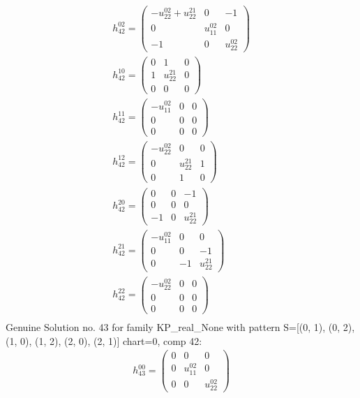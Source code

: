\documentclass[a4paper, 11pt, twoside, onecolumn]{article}
\begin{document}
\begin{landscape}
\begin{gather*}
	 h_{42}^{02}=\begin{pmatrix}- u^{02}_{22} + u^{21}_{22} & 0 & -1\\0 & u^{02}_{11} & 0\\-1 & 0 & u^{02}_{22}\end{pmatrix}\\ 
	 h_{42}^{10}=\begin{pmatrix}0 & 1 & 0\\1 & u^{21}_{22} & 0\\0 & 0 & 0\end{pmatrix}\\ 
	 h_{42}^{11}=\begin{pmatrix}- u^{02}_{11} & 0 & 0\\0 & 0 & 0\\0 & 0 & 0\end{pmatrix}\\ 
	 h_{42}^{12}=\begin{pmatrix}- u^{02}_{22} & 0 & 0\\0 & u^{21}_{22} & 1\\0 & 1 & 0\end{pmatrix}\\ 
	 h_{42}^{20}=\begin{pmatrix}0 & 0 & -1\\0 & 0 & 0\\-1 & 0 & u^{21}_{22}\end{pmatrix}\\ 
	 h_{42}^{21}=\begin{pmatrix}- u^{02}_{11} & 0 & 0\\0 & 0 & -1\\0 & -1 & u^{21}_{22}\end{pmatrix}\\ 
	 h_{42}^{22}=\begin{pmatrix}- u^{02}_{22} & 0 & 0\\0 & 0 & 0\\0 & 0 & 0\end{pmatrix}\\ 
\end{gather*} 
Genuine Solution no. 43 for family KP_real_None with pattern S=[(0, 1), (0, 2), (1, 0), (1, 2), (2, 0), (2, 1)] chart=0, comp 42: 
\begin{gather*} 
	 h_{43}^{00}=\begin{pmatrix}0 & 0 & 0\\0 & u^{02}_{11} & 0\\0 & 0 & u^{02}_{22}\end{pmatrix}\\ 

\end{gather*}
\end{landscape}
\end{document}
